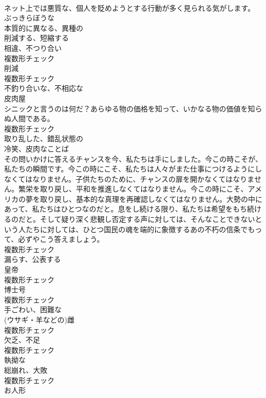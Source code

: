 \documentclass[8pt]{extreport}
\begin{document}
\begin{CJK}{UTF8}{min}
\\	ネット上では悪質な、個人を貶めようとする行動が多く見られる気がします。	
\\	[形容詞]	ぶっきらぼうな	
\\	[形容詞]	本質的に異なる、異種の	
\\	[動詞]	削減する、短縮する	
\\	[名詞]	相違、不つり合い	
\\	複数形チェック
\\	[名詞]	削減	
\\	複数形チェック
\\	[形容詞]	不釣り合いな、不相応な	
\\	[名詞]	皮肉屋	
\\	シニックと言うのは何だ？あらゆる物の価格を知って、いかなる物の価値を知らぬ人間である。	
\\	複数形チェック
\\	[形容詞]	取り乱した、錯乱状態の	
\\	[名詞]	冷笑、皮肉なことば	
\\	その問いかけに答えるチャンスを今、私たちは手にしました。今この時こそが、私たちの瞬間です。今この時にこそ、私たちは人々がまた仕事につけるようにしなくてはなりません。子供たちのために、チャンスの扉を開かなくてはなりません。繁栄を取り戻し、平和を推進しなくてはなりません。今この時にこそ、アメリカの夢を取り戻し、基本的な真理を再確認しなくてはなりません。大勢の中にあって、私たちはひとつなのだと。息をし続ける限り、私たちは希望をもち続けるのだと。そして疑り深く悲観し否定する声に対しては、そんなことできないという人たちに対しては、ひとつ国民の魂を端的に象徴するあの不朽の信条でもって、必ずやこう答えましょう。	
\\	複数形チェック
\\	[動詞]	漏らす、公表する	
\\	[名詞]	皇帝	
\\	複数形チェック
\\	[名詞]	博士号	
\\	複数形チェック
\\	[形容詞]	手ごわい、困難な	
\\	[名詞]	(ウサギ・羊などの)雌	
\\	複数形チェック
\\	[名詞]	欠乏、不足	
\\	複数形チェック
\\	[形容詞]	執拗な	
\\	[名詞]	総崩れ、大敗	
\\	複数形チェック
\\	[名詞]	お人形	

\end{CJK}
\end{document}
